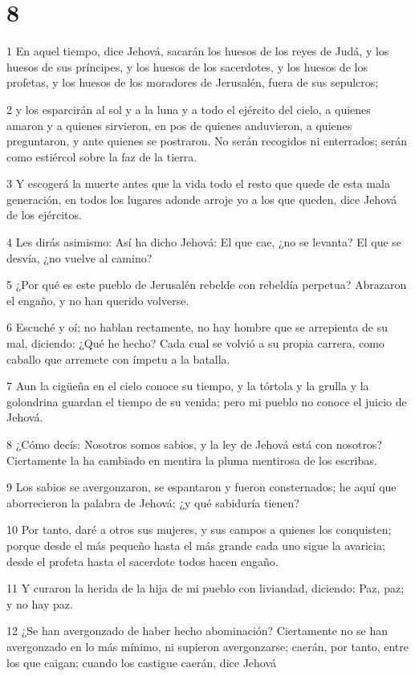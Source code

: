 \chapter{8}

\par 1 En aquel tiempo, dice Jehová, sacarán los huesos de los reyes de Judá, y los huesos de sus príncipes, y los huesos de los sacerdotes, y los huesos de los profetas, y los huesos de los moradores de Jerusalén, fuera de sus sepulcros;
\par 2 y los esparcirán al sol y a la luna y a todo el ejército del cielo, a quienes amaron y a quienes sirvieron, en pos de quienes anduvieron, a quienes preguntaron, y ante quienes se postraron. No serán recogidos ni enterrados; serán como estiércol sobre la faz de la tierra.
\par 3 Y escogerá la muerte antes que la vida todo el resto que quede de esta mala generación, en todos los lugares adonde arroje yo a los que queden, dice Jehová de los ejércitos.
\par 4 Les dirás asimismo: Así ha dicho Jehová: El que cae, ¿no se levanta? El que se desvía, ¿no vuelve al camino?
\par 5 ¿Por qué es este pueblo de Jerusalén rebelde con rebeldía perpetua? Abrazaron el engaño, y no han querido volverse.
\par 6 Escuché y oí; no hablan rectamente, no hay hombre que se arrepienta de su mal, diciendo: ¿Qué he hecho? Cada cual se volvió a su propia carrera, como caballo que arremete con ímpetu a la batalla.
\par 7 Aun la cigüeña en el cielo conoce su tiempo, y la tórtola y la grulla y la golondrina guardan el tiempo de su venida; pero mi pueblo no conoce el juicio de Jehová.
\par 8 ¿Cómo decís: Nosotros somos sabios, y la ley de Jehová está con nosotros? Ciertamente la ha cambiado en mentira la pluma mentirosa de los escribas.
\par 9 Los sabios se avergonzaron, se espantaron y fueron consternados; he aquí que aborrecieron la palabra de Jehová; ¿y qué sabiduría tienen?
\par 10 Por tanto, daré a otros sus mujeres, y sus campos a quienes los conquisten; porque desde el más pequeño hasta el más grande cada uno sigue la avaricia; desde el profeta hasta el sacerdote todos hacen engaño.
\par 11 Y curaron la herida de la hija de mi pueblo con liviandad, diciendo: Paz, paz; y no hay paz. 
\par 12 ¿Se han avergonzado de haber hecho abominación? Ciertamente no se han avergonzado en lo más mínimo, ni supieron avergonzarse; caerán, por tanto, entre los que caigan; cuando los castigue caerán, dice Jehová 
